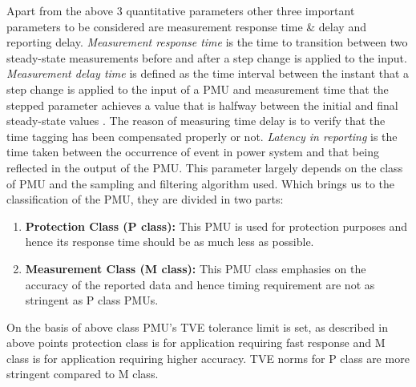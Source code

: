 Apart from the above 3 quantitative parameters other three important parameters to be considered are measurement response time \& delay and reporting delay. \textit{Measurement response time} is the time to transition between two steady-state measurements before and after a step change is applied to the input. \textit{Measurement delay time} is defined as the time interval between the instant that a step change is applied to the input of a PMU and measurement time that the stepped parameter achieves a value that is halfway between the initial and final steady-state values \cite{std:c37}. The reason of measuring time delay is to verify that the time tagging has been compensated properly or not.  \textit{Latency in reporting} is the time taken between the occurrence of event in power system and that being reflected in the output of the PMU. This parameter largely depends on the class of PMU and the sampling and filtering algorithm used. Which brings us to the classification of the PMU, they are divided in two parts:
\begin{enumerate}
\item \textbf{Protection Class (P class):} This PMU is used for protection purposes and hence its response time should be as much less as possible.
\item \textbf{Measurement Class (M class):}  This PMU class emphasies on the accuracy of the reported data and hence timing requirement are not as stringent as P class PMUs.
\end{enumerate} 

On the basis of above class PMU's TVE tolerance limit is set, as described in above points protection class is for application requiring fast response and M class is for application requiring higher accuracy. TVE norms for P class are more stringent compared to M class. 

